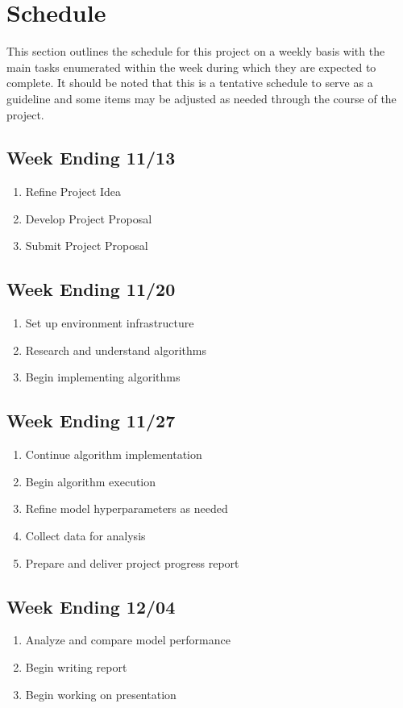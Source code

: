 \documentclass[conference]{IEEEtran}
\begin{document}
\section{Schedule}
This section outlines the schedule for this project on a weekly basis with the main tasks enumerated within the week during which they are expected to complete.
It should be noted that this is a tentative schedule to serve as a guideline and some items may be adjusted as needed through the course of the project.

\subsection{Week Ending 11/13}
\begin{enumerate}
    \item Refine Project Idea
    \item Develop Project Proposal
    \item Submit Project Proposal
\end{enumerate}

\subsection{Week Ending 11/20}
\begin{enumerate}
    \item Set up environment infrastructure
    \item Research and understand algorithms
    \item Begin implementing algorithms
\end{enumerate}

\subsection{Week Ending 11/27}
\begin{enumerate}
    \item Continue algorithm implementation
    \item Begin algorithm execution
    \item Refine model hyperparameters as needed
    \item Collect data for analysis
    \item Prepare and deliver project progress report
\end{enumerate}

\subsection{Week Ending 12/04}
\begin{enumerate}
    \item Analyze and compare model performance
    \item Begin writing report
    \item Begin working on presentation
\end{enumerate}
\end{document}
